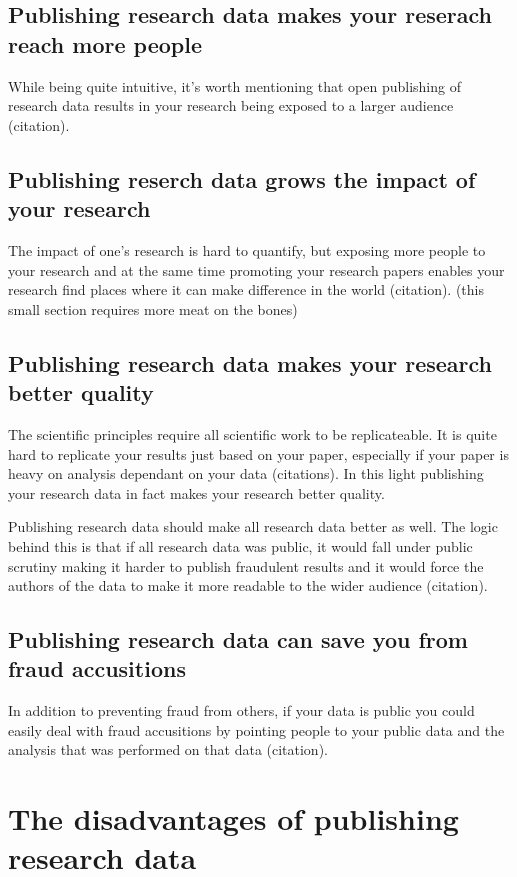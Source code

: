 \subsection{Publishing research data makes your reserach reach more people}

While being quite intuitive, it's worth mentioning that open publishing of
research data results in your research being exposed to a larger audience
(citation).

\subsection{Publishing reserch data grows the impact of your research}

The impact of one's research is hard to quantify, but exposing more people to
your research and at the same time promoting your research papers enables your
research find places where it can make difference in the world (citation).
(this small section requires more meat on the bones)

\subsection{Publishing research data makes your research better quality}

The scientific principles require all scientific work to be replicateable. It
is quite hard to replicate your results just based on your paper, especially if
your paper is heavy on analysis dependant on your data (citations). In this
light publishing your research data in fact makes your research better quality.

Publishing research data should make all research data better as well. The
logic behind this is that if all research data was public, it would fall under
public scrutiny making it harder to publish fraudulent results and it would
force the authors of the data to make it more readable to the wider audience
(citation).

\subsection{Publishing research data can save you from fraud accusitions}

In addition to preventing fraud from others, if your data is public you could
easily deal with fraud accusitions by pointing people to your public data and
the analysis that was performed on that data (citation).

\section{The disadvantages of publishing research data}

